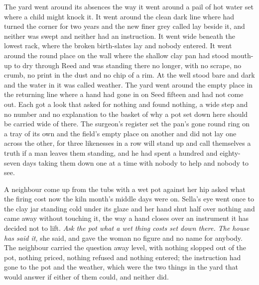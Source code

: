 The yard went around its absences the way it went around a pail of hot water set where a child might knock it. It went around the clean dark line where  had turned the corner for two years and the new finer grey called  lay beside it, and neither was swept and neither had an instruction. It went wide beneath the lowest rack, where the broken birth-slates lay and nobody entered. It went around the round place on the wall where the shallow clay pan had stood mouth-up to dry through Reed and was standing there no longer, with no scrape, no crumb, no print in the dust and no chip of a rim. At the well  stood bare and dark and the water in it was called weather. The yard went around the empty place in the returning line where a hand had gone in on Seed fifteen and had not come out. Each got a look that asked for nothing and found nothing, a wide step and no number and no explanation to the basket of why a pot set down here should be carried wide of there. The surgeon's register set the pan's gone round ring on a tray of its own and the field's empty place on another and did not lay one across the other, for three likenesses in a row will stand up and call themselves a truth if a man leaves them standing, and he had spent a hundred and eighty-seven days taking them down one at a time with nobody to help and nobody to see.

A neighbour come up from the tubs with a wet pot against her hip asked what the firing cost now the kiln month's middle days were on. Sella's eye went once to the clay jar standing cold under its glaze and her hand shut half over nothing and came away without touching it, the way a hand closes over an instrument it has decided not to lift. \emph{Ask the pot what a wet thing costs set down there. The house has said it,} she said, and gave the woman no figure and no name for anybody. The neighbour carried the question away level, with nothing slopped out of the pot, nothing priced, nothing refused and nothing entered; the instruction had gone to the pot and the weather, which were the two things in the yard that would answer if either of them could, and neither did.

